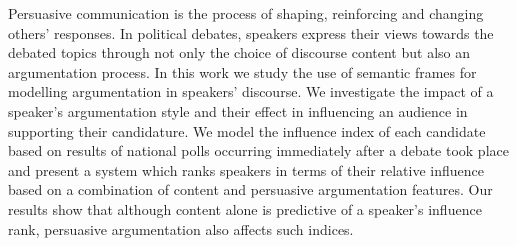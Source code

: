 Persuasive communication is the process of shaping, reinforcing and changing others' responses. In political debates, speakers express their views towards the debated topics through not only the choice of discourse content but also an argumentation process. In this work we study the use of semantic frames for modelling argumentation in speakers' discourse. We investigate the impact of a speaker's argumentation style and their effect in influencing an audience in supporting their candidature. We model the influence index of each candidate based on results of national polls occurring immediately after a debate took place and present a system which ranks speakers in terms of their relative influence based on a combination of content and persuasive argumentation features. Our results show that although content alone is predictive of a speaker's influence rank, persuasive argumentation also affects such indices.
